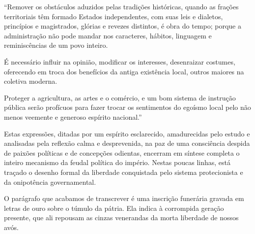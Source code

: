 ``Remover os obstáculos aduzidos pelas tradições históricas, quando as
frações territoriais têm formado Estados independentes, com suas leis e
dialetos, princípios e magistrados, glórias e revezes distintos, é obra
do tempo; porque a administração não pode mandar nos caracteres,
hábitos, linguagem e reminiscências de um povo inteiro.

É necessário influir na opinião, modificar os interesses, desenraizar
costumes, oferecendo em troca dos benefícios da antiga existência local,
outros maiores na coletiva moderna.

Proteger a agricultura, as artes e o comércio, e um bom sistema de
instrução pública serão profícuos para fazer trocar os sentimentos do
egoísmo local pelo não menos veemente e generoso espírito nacional.''

Estas expressões, ditadas por um espírito esclarecido, amadurecidas pelo
estudo e analisadas pela reflexão calma e desprevenida, na paz de uma
consciência despida de paixões políticas e de concepções odientas,
encerram em síntese completa o inteiro mecanismo da feudal política do
império. Nestas poucas linhas, está traçado o desenho formal da
liberdade conquistada pelo sistema protecionista e da onipotência
governamental.

O parágrafo que acabamos de transcrever é uma inscrição funerária
gravada em letras de ouro sobre o túmulo da pátria. Ela indica à
corrompida geração presente, que ali repousam as cinzas venerandas da
morta liberdade de nossos avós.

